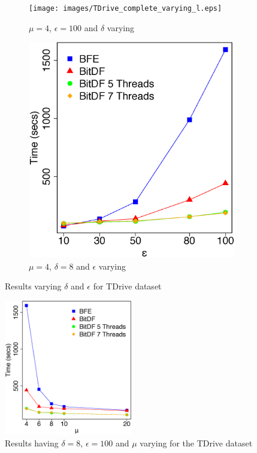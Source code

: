 {\begin{figure}[h!]
    \centering
    \begin{subfigure}[t]{0.49\textwidth}
        \texttt{[image: images/TDrive\_complete\_varying\_l.eps]}
        \caption{$\mu = 4$, $\epsilon = 100$ and $\delta$ varying}
        \label{fig:tdrive_complete_vary_l}
    \end{subfigure}
    \begin{subfigure}[t]{0.49\textwidth}
        \includegraphics[width=\textwidth]{images/TDrive_complete_varying_g.eps}
        \caption{$\mu = 4$, $\delta = 8$ and $\epsilon$ varying}
        \label{fig:tdrive_complete_vary_g}
    \end{subfigure}
    \caption{Results varying $\delta$ and $\epsilon$ for TDrive dataset}
    \label{fig:tdrive_complete_results}
\end{figure}

\begin{figure}[h!]
    \centering
    \includegraphics[width=0.5\textwidth]{images/TDrive_complete_varying_n.eps}
    \caption{Results having $\delta = 8$, $\epsilon = 100$ and $\mu$ varying for the TDrive dataset}
    \label{fig:tdrive_complete_vary_n}
\end{figure}

}
